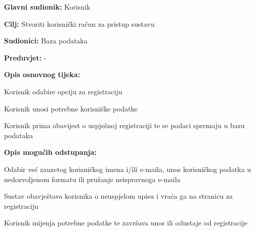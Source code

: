 \noindent {}
\begin{packed_item}

	\item \textbf{Glavni sudionik: } Korisnik
	\item  \textbf{Cilj:} Stvoriti korisnički račun za pristup sustavu
	\item  \textbf{Sudionici:} Baza podataka
	\item  \textbf{Preduvjet:} -
	\item  \textbf{Opis osnovnog tijeka:}

	\item[] \begin{packed_enum}

		\item Korisnik odabire opciju za registraciju
		\item Korisnik unosi potrebne korisničke podatke
		\item Korisnik prima obavijest o uspješnoj registraciji te se podaci spremaju u bazu podataka

	\end{packed_enum}

	\item  \textbf{Opis mogućih odstupanja:}

	\item[] \begin{packed_item}

		\item[2.a] Odabir već zauzetog korisničkog imena i/ili e-maila, unos korisničkog podatka u nedozvoljenom formatu ili pružanje neispravnoga e-maila

		\item[] \begin{packed_enum}

			\item Sustav obavještava korisnika o neuspjelom upisu i vraća ga na stranicu za registraciju
			\item Korisnik mijenja potrebne podatke te završava unos ili odustaje od registracije

		\end{packed_enum}

	\end{packed_item}
\end{packed_item}

